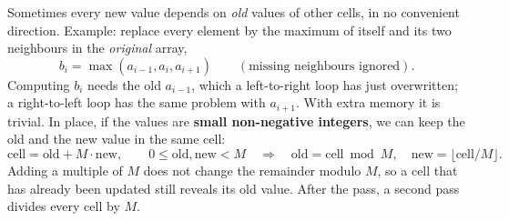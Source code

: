 Sometimes every new value depends on \emph{old} values of other cells, in no convenient direction. Example: replace every element by the maximum of itself and its two neighbours in the \emph{original} array,
\[
b_i = \max(a_{i-1}, a_i, a_{i+1}) \qquad (\text{missing neighbours ignored}).
\]
Computing $b_i$ needs the old $a_{i-1}$, which a left-to-right loop has just overwritten; a right-to-left loop has the same problem with $a_{i+1}$. With extra memory it is trivial. In place, if the values are \textbf{small non-negative integers}, we can keep the old and the new value in the same cell:
\[
\text{cell} = \text{old} + M \cdot \text{new}, \qquad 0 \le \text{old}, \text{new} < M
\quad\Longrightarrow\quad
\text{old} = \text{cell} \bmod M, \quad \text{new} = \lfloor \text{cell} / M \rfloor .
\]
Adding a multiple of $M$ does not change the remainder modulo $M$, so a cell that has already been updated still reveals its old value. After the pass, a second pass divides every cell by $M$.

\begin{diagrambox}
\end{diagrambox}

